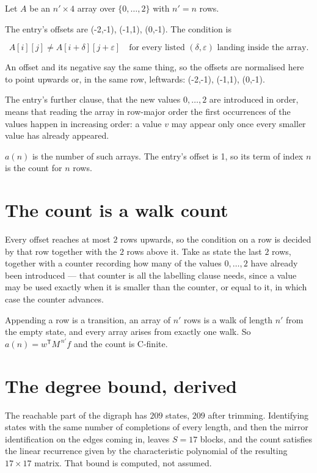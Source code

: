 \documentclass[11pt]{article}
\theoremstyle{definition}
\begin{document}
Let $A$ be an $n' \times 4$ array over $\{0,\dots,2\}$ with $n' = n$ rows.

The entry's offsets are (-2,-1), (-1,1), (0,-1). The condition is

\[A[i][j] \ne A[i{+}\delta][j{+}\varepsilon]\quad\text{for every listed }(\delta,\varepsilon)\text{ landing inside the array.}\]

An offset and its negative say the same thing, so the offsets are normalised here to point upwards or, in the same row, leftwards: (-2,-1), (-1,1), (0,-1).

The entry's further clause, that the new values $0,\dots,2$ are introduced in order, means that reading the array in row-major order the first occurrences of the values happen in increasing order: a value $v$ may appear only once every smaller value has already appeared.

$a(n)$ is the number of such arrays. The entry's offset is 1, so its term of index $n$ is the count for $n$ rows.

\section{The count is a walk count}

Every offset reaches at most $2$ rows upwards, so the condition on a row is decided by that row together with the $2$ rows above it. Take as state the last $2$ rows, together with a counter recording how many of the values $0,\dots,2$ have already been introduced --- that counter is all the labelling clause needs, since a value may be used exactly when it is smaller than the counter, or equal to it, in which case the counter advances.

Appending a row is a transition, an array of $n'$ rows is a walk of length $n'$ from the empty state, and every array arises from exactly one walk. So $a(n) = w^{\mathsf T}M^{\,n'}f$ and the count is C-finite.

\section{The degree bound, derived}

The reachable part of the digraph has $209$ states, $209$ after trimming. Identifying states with the same number of completions of every length, and then the mirror identification on the edges coming in, leaves $S = 17$ blocks, and the count satisfies the linear recurrence given by the characteristic polynomial of the resulting $17\times17$ matrix. That bound is computed, not assumed.
\end{document}

